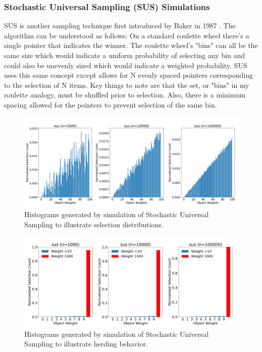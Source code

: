 \documentclass[12pt]{article}
\begin{document}
    \subsubsection{Stochastic Universal Sampling (SUS) Simulations}
    SUS is another sampling technique first introduced by Baker in 1987
    \cite{baker1987}.
    The algorithm can be understood as follows: On a standard roulette wheel
    there's a single pointer that indicates the winner. The roulette wheel's
    "bins" can all be the same size which would indicate a uniform probability
    of selecting any bin and could also be unevenly sized which would indicate
    a weighted probability. SUS uses this same concept except allows for N
    evenly spaced pointers corresponding to the selection of N items. Key
    things to note are that the set, or "bins" in my roulette analogy, must be
    shuffled prior to selection. Also, there is a minimum spacing allowed for
    the pointers to prevent selection of the same bin.

    \begin{figure}[htbp]
      \centering
      \includegraphics[scale=0.32]{images/herding_roullette.png} 
      \caption{Histograms generated by simulation of Stochastic Universal
               Sampling to illustrate selection distributions.}
      \label{fig:herding_roullette}
    \end{figure}

    \begin{figure}[htbp]
      \centering
      \includegraphics[scale=0.32]{images/pathological_roullette.png} 
      \caption{Histograms generated by simulation of Stochastic Universal
               Sampling to illustrate herding behavior.}
      \label{fig:pathological_roullette}
    \end{figure}
\end{document}
